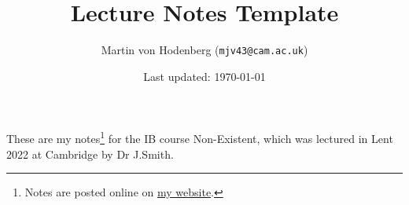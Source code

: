 \documentclass[egregdoesnotlikesansseriftitles,a4paper]{scrartcl}
\title{Lecture Notes Template}
\author{Martin von Hodenberg (\texttt{mjv43@cam.ac.uk})}
\date{Last updated: \today}
\begin{document}
\maketitle
These are my notes\footnote{Notes are posted online on \href{https://mjv43.user.srcf.net/}{my website}.} for the IB course Non-Existent, which was lectured in Lent 2022 at Cambridge by Dr J.Smith.
\newpage
\tableofcontents
\newpage
\end{document}
